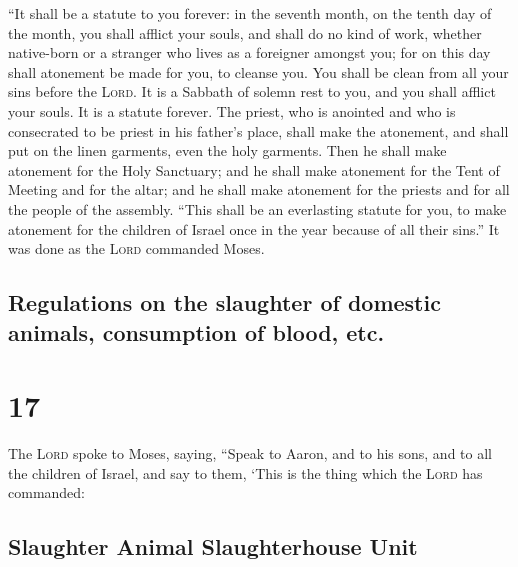  ``It shall be a statute to you forever: in the seventh
month, on the tenth day of the month, you shall afflict your souls, and
shall do no kind of work, whether native-born or a stranger who lives as
a foreigner amongst you;  for on this day shall atonement
be made for you, to cleanse you. You shall be clean from all your sins
before the \textsc{Lord}.  It is a Sabbath of solemn rest
to you, and you shall afflict your souls. It is a statute forever.
 The priest, who is anointed and who is consecrated to be
priest in his father's place, shall make the atonement, and shall put on
the linen garments, even the holy garments.  Then he
shall make atonement for the Holy Sanctuary; and he shall make atonement
for the Tent of Meeting and for the altar; and he shall make atonement
for the priests and for all the people of the assembly. 
``This shall be an everlasting statute for you, to make atonement for
the children of Israel once in the year because of all their sins.'' It
was done as the \textsc{Lord} commanded Moses.

\hypertarget{regulations-on-the-slaughter-of-domestic-animals-consumption-of-blood-etc.}{%
\subsection{Regulations on the slaughter of domestic animals,
consumption of blood,
etc.}\label{regulations-on-the-slaughter-of-domestic-animals-consumption-of-blood-etc.}}

\hypertarget{section-16}{%
\section{17}\label{section-16}}

 The \textsc{Lord} spoke to Moses, saying, 
``Speak to Aaron, and to his sons, and to all the children of Israel,
and say to them, `This is the thing which the \textsc{Lord} has
commanded:

\hypertarget{slaughter-animal-slaughterhouse-unit}{%
\subsection{Slaughter Animal Slaughterhouse
Unit}\label{slaughter-animal-slaughterhouse-unit}}

